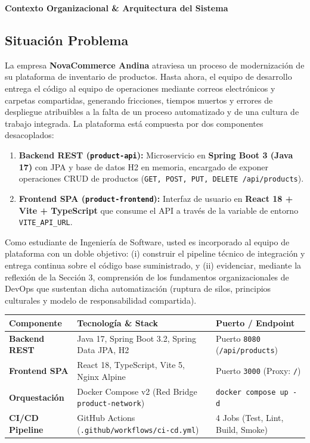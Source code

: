 \documentclass[10pt,letterpaper]{article}
\newcommand{\sectionBadge}[1]{%
  \refstepcounter{section}%
  \vspace{0.24cm}%
  \noindent%
  \colorbox{icesiBlue}{\color{white}\rule[-0.08cm]{0pt}{0.42cm}\hspace{0.16cm}\textbf{\normalsize \thesection}\hspace{0.16cm}}%
  \hspace{0.18cm}%
  {\fontsize{9.5}{12}\selectfont\textbf{\color{icesiDark}#1}}\\[-0.10cm]%
  \noindent{\color{icesiDark}\rule{\textwidth}{0.8pt}}\vspace{0.10cm}%
}
\begin{document}
\vspace{0.12cm}

\sectionBadge{Contexto Organizacional \& Arquitectura del Sistema}

\subsection{Situación Problema}
La empresa \textbf{NovaCommerce Andina} atraviesa un proceso de modernización de su plataforma de inventario de productos. Hasta ahora, el equipo de desarrollo entrega el código al equipo de operaciones mediante correos electrónicos y carpetas compartidas, generando fricciones, tiempos muertos y errores de despliegue atribuibles a la falta de un proceso automatizado y de una cultura de trabajo integrada. La plataforma está compuesta por dos componentes desacoplados:
\begin{enumerate}[leftmargin=*,itemsep=1.5pt,topsep=1.5pt]
  \item \textbf{Backend REST (\texttt{product-api}):} Microservicio en \textbf{Spring Boot 3 (Java 17)} con JPA y base de datos H2 en memoria, encargado de exponer operaciones CRUD de productos (\texttt{GET, POST, PUT, DELETE /api/products}).
  \item \textbf{Frontend SPA (\texttt{product-frontend}):} Interfaz de usuario en \textbf{React 18 + Vite + TypeScript} que consume el API a través de la variable de entorno \texttt{VITE\_API\_URL}.
\end{enumerate}

Como estudiante de Ingeniería de Software, usted es incorporado al equipo de plataforma con un doble objetivo: (i) construir el pipeline técnico de integración y entrega continua sobre el código base suministrado, y (ii) evidenciar, mediante la reflexión de la Sección 3, comprensión de los fundamentos organizacionales de DevOps que sustentan dicha automatización (ruptura de silos, principios culturales y modelo de responsabilidad compartida).

\vspace{0.08cm}
\noindent
\small
\begin{tabularx}{\textwidth}{|L{2.8cm}|X|L{3.5cm}|}
\hline
{}
\textbf{Componente} & \textbf{Tecnología \& Stack} & \textbf{Puerto / Endpoint} \\ \hline
\textbf{Backend REST} & Java 17, Spring Boot 3.2, Spring Data JPA, H2 & Puerto \texttt{8080} (\texttt{/api/products}) \\ \hline
\textbf{Frontend SPA} & React 18, TypeScript, Vite 5, Nginx Alpine & Puerto \texttt{3000} (Proxy: \texttt{/}) \\ \hline
\textbf{Orquestación} & Docker Compose v2 (Red Bridge \texttt{product-network}) & \texttt{docker compose up -d} \\ \hline
\textbf{CI/CD Pipeline} & GitHub Actions (\texttt{.github/workflows/ci-cd.yml}) & 4 Jobs (Test, Lint, Build, Smoke) \\ \hline
\end{tabularx}
\end{document}
